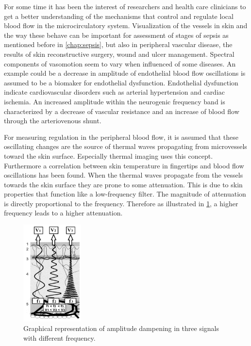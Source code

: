 \label{freq}

For some time it has been the interest of researchers and health care clinicians to get a better understanding of the mechanisms that control and regulate local blood flow in the microcirculatory system\cite{sagaidachnyi2014,sagaidachnyi2017,geyer2004,liu2012}. 
Visualization of the vessels in skin and the way these behave can be important for assessment of stages of sepsis as mentioned before in \cref{chap:sepsis}, but also in peripheral vascular disease, the results of skin reconstructive surgery, wound and ulcer management.\cite{liu2012,kanta2014}
Spectral components of vasomotion seem to vary when influenced of some diseases. An example could be a decrease in amplitude of endothelial blood flow oscillations is assumed to be a biomaker for endothelial dysfunction. Endothelial dysfunction indicate cardiovascular disorders such as arterial hypertension and cardiac ischemia. An increased amplitude within the neurogenic frequency band is characterized by a decrease of vascular resistance and an increase of blood flow through the arteriovenous shunt.\cite{sagaidachnyi2017}

For measuring regulation in the peripheral blood flow, it is assumed that these oscillating changes are the source of thermal waves propagating from microvessels toward the skin surface. Especially thermal imaging uses this concept.\cite{sagaidachnyi2017}
Furthermore a correlation between skin temperature in fingertips and blood flow oscillations has been found\cite{sagaidachnyi2014}.
When the thermal waves propagate from the vessels towards the skin surface they are prone to some attenuation. This is due to skin properties that function like a low-frequency filter.\cite{podtaev2008}
The magnitude of attenuation is directly proportional to the frequency.
Therefore as illustrated in \cref{fig:atten}, a higher frequency leads to a higher attenuation.   

\begin{figure}[H]
	\centering	\includegraphics[width=0.28\textwidth]{figures/attenuation}
	\caption{Graphical representation of amplitude dampening in three signals with different frequency.\cite{sagaidachnyi2014}}
	\label{fig:atten}
\end{figure} \vspace{-.3cm}


